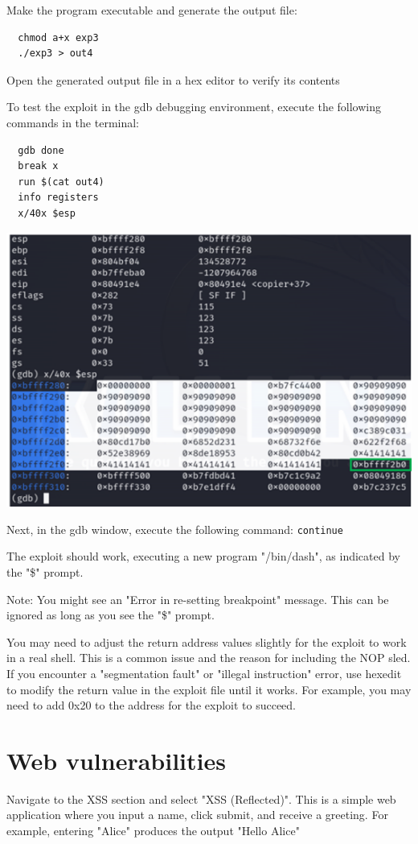 \documentclass[]{project_plan}
\begin{document}
Make the program executable and generate the output file:
\begin{lstlisting}
  chmod a+x exp3
  ./exp3 > out4
\end{lstlisting}
Open the generated output file in a hex editor to verify its contents

To test the exploit in the gdb debugging environment, execute the following commands in the terminal:
\begin{lstlisting}
  gdb done
  break x
  run $(cat out4)
  info registers
  x/40x $esp
\end{lstlisting}

\includegraphics[width=.8\linewidth]{lab4 exploit running.png}

Next, in the gdb window, execute the following command: \lstinline|continue|

The exploit should work, executing a new program "/bin/dash", as indicated by
the "\$" prompt.

Note: You might see an "Error in re-setting breakpoint" message.
This can be ignored as long as you see the "\$" prompt.

You may need to adjust the return address values slightly
for the exploit to work in a real shell. This is a common issue
and the reason for including the NOP sled. If you encounter
a "segmentation fault" or "illegal instruction" error, use hexedit to
modify the return value in the exploit
file until it works. For example, you may need to add 0x20
to the address for the exploit to succeed.

\section{Web vulnerabilities}

Navigate to the XSS section and select "XSS (Reflected)". This is a
simple web application where you input a name, click submit, and receive
a greeting. For example, entering "Alice" produces the output "Hello Alice"
\end{document}
